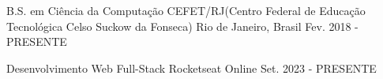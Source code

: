 

\begin{cventries}

  \cventry
    {B.S. em Ciência da Computação} %
    {CEFET/RJ(Centro Federal de Educação Tecnológica Celso Suckow da Fonseca)} %
    {Rio de Janeiro, Brasil} %
    {Fev. 2018 - PRESENTE} %
    {}

  \cventry
    {Desenvolvimento Web Full-Stack} %
    {Rocketseat} %
    {Online} %
    {Set. 2023 - PRESENTE} %
    {}

\end{cventries}
